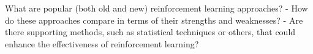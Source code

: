 What are popular (both old and new) reinforcement learning approaches?  
- How do these approaches compare in terms of their strengths and weaknesses?  
- Are there supporting methods, such as statistical techniques or others, that could enhance the effectiveness of reinforcement learning?


